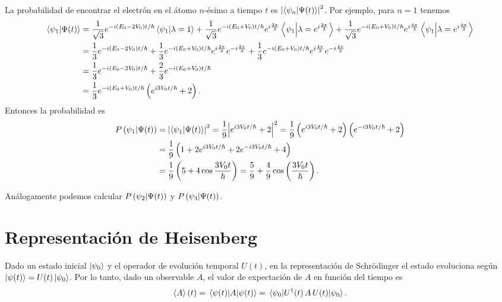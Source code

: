 \documentclass[10pt, a4paper]{article}
\numberwithin{equation}{subsection}
\begin{document}
La probabilidad de encontrar el electrón en el átomo $n$-ésimo a tiempo $t$ es
$\abs{\braket{\psi_n}{\Psi(t)}}^2$. Por ejemplo, para $n = 1$ tenemos
\begin{align}
  \braket{\psi_1}{\Psi(t)} &= 
    \frac{1}{\sqrt{3}} e^{-{i(E_0-2V_0)t}/{\hbar}} \braket{\psi_1}{\lambda = 1} +
    \frac{1}{\sqrt{3}} e^{-{i(E_0+V_0)t}/{\hbar}} e^{i\frac{2\pi}{3}}
    \braket{\psi_1}{\lambda = e^{i\frac{2\pi}{3}}} +
    \frac{1}{\sqrt{3}} e^{-{i(E_0+V_0)t}/{\hbar}} e^{i\frac{4\pi}{3}}
    \braket{\psi_1}{\lambda = e^{i\frac{4\pi}{3}}} \nonumber \\
  &= \frac{1}{3} e^{-{i(E_0-2V_0)t}/{\hbar}} +
    \frac{1}{3} e^{-{i(E_0+V_0)t}/{\hbar}} e^{i\frac{2\pi}{3}}
    e^{-i\frac{2\pi}{3}} +
    \frac{1}{3} e^{-{i(E_0+V_0)t}/{\hbar}} e^{i\frac{4\pi}{3}}
    e^{-i\frac{4\pi}{3}} \nonumber \\
  &= \frac{1}{3} e^{-{i(E_0-2V_0)t}/{\hbar}} +
    \frac{2}{3} e^{-{i(E_0+V_0)t}/{\hbar}} \nonumber \\
  &= \frac{1}{3}e^{-{i(E_0+V_0)t}/{\hbar}}\left(e^{{i3V_0t}/{\hbar}} +
    2\right).
\end{align}
Entonces la probabilidad es
\begin{align}
  P\left({\psi_1}\middle|{\Psi(t)}\right) &= \abs{\braket{\psi_1}{\Psi(t)}}^2 =
    \frac{1}{9}\abs{e^{{i3V_0t}/{\hbar}} + 2}^2 =
    \frac{1}{9}\left(e^{{i3V_0t}/{\hbar}} + 2\right)
    \left(e^{{-i3V_0t}/{\hbar}} + 2\right) \nonumber \\
  &= \frac{1}{9}\left(1 + 2e^{{i3V_0t}/{\hbar}} +
    2e^{{-i3V_0t}/{\hbar}} + 4\right) \nonumber \\
  &= \frac{1}{9}\left(5 + 4\cos\frac{3V_0t}{\hbar}\right)
   = \frac{5}{9} + \frac{4}{9}\cos\left(\frac{3V_0t}{\hbar}\right).
\end{align}

Análogamente podemos calcular $P\left({\psi_2}\middle|{\Psi(t)}\right)$ y
$P\left({\psi_3}\middle|{\Psi(t)}\right)$.

\section{Representación de Heisenberg}

Dado un estado inicial $\ket{\psi_0}$ y el operador de evolución temporal
$U(t)$, en la representación de Schrödinger el estado evoluciona según
$\ket{\psi(t)} = U(t)\ket{\psi_0}$. Por lo tanto, dado un observable $A$, el
valor de expectación de $A$ en función del tiempo es
\begin{equation}
  \expval{A}(t) = \expval{A}{\psi(t)} = \expval{U^\dagger(t)\,{A}\,U(t)}{\psi_0}.
\end{equation}
\end{document}
